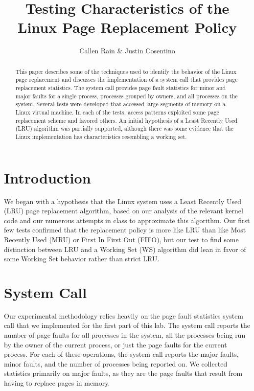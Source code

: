 \documentclass[twocolumn]{article}
\begin{document}
\title{Testing Characteristics of the Linux Page Replacement Policy}

\author{Callen Rain \& Justin Cosentino}

\maketitle

\begin{abstract}
This paper describes some of the techniques used to identify the behavior of the Linux page replacement and discusses the implementation of a system call that provides page replacement statistics.  The system call provides page fault statistics for minor and major faults for a single process, processes grouped by owners, and all processes on the system. Several tests were developed that accessed large segments of memory on a Linux virtual machine. In each of the tests, access patterns exploited some page replacement scheme and favored others. An initial hypothesis of a Least Recently Used (LRU) algorithm was partially supported, although there was some evidence that the Linux implementation has characteristics resembling a working set. 
\end{abstract}

\section{Introduction}

We began with a hypothesis that the Linux system uses a Least Recently Used (LRU) page replacement algorithm, based on our analysis of the relevant kernel code and our numerous attempts in class to approximate this algorithm.  Our first few tests confirmed that the replacement policy is more like LRU than like Most Recently Used (MRU) or First In First Out (FIFO), but our test to find some distinction between LRU and a Working Set (WS) algorithm did lean in favor of some Working Set behavior rather than strict LRU. 


\section{System Call}
Our experimental methodology relies heavily on the page fault statistics system call that we implemented for the first part of this lab. The system call reports the number of page faults for all processes in the system, all the processes being run by the owner of the current process, or just the page faults for the current process. For each of these operations, the system call reports the major faults, minor faults, and the number of processes being reported on. We collected statistics primarily on major faults, as they are the page faults that result from having to replace pages in memory. 
\end{document}
